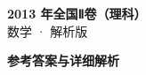 \documentclass[zihao=-4, a4paper]{ctexart}
\begin{document}
\begin{center}
  {\Large\bfseries 2013 年全国Ⅱ卷（理科）}\\[4pt]
  {\large 数学 · 解析版}
\end{center}
\medskip
{}

\clearpage
{}
\begin{center}{\Large\bfseries 参考答案与详细解析}\end{center}
\medskip

\end{document}
